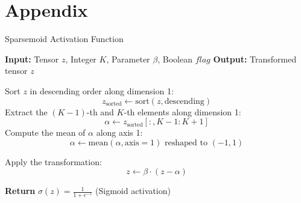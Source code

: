 


\section{Appendix}\label{appendix}

\begin{algorithm}\label{app:sparsemoid}
\caption{Sparsemoid Activation Function}
\begin{algorithmic}[1]
\State \textbf{Input:} Tensor $z$, Integer $K$, Parameter $\beta$, Boolean $flag$
\State \textbf{Output:} Transformed tensor $z$

    \State Sort $z$ in descending order along dimension 1:
    \[
    z_{\text{sorted}} \leftarrow \text{sort}(z, \text{descending})
    \]
    \State Extract the $(K-1)$-th and $K$-th elements along dimension 1:
    \[
    \alpha \leftarrow z_{\text{sorted}}[:, K-1:K+1]
    \]
    \State Compute the mean of $\alpha$ along axis 1:
    \[
    \alpha \leftarrow \text{mean}(\alpha, \text{axis}=1) \text{ reshaped to } (-1,1)
    \]
\EndIf

\State Apply the transformation:
\[
z \leftarrow \beta \cdot (z - \alpha)
\]

\State \textbf{Return} $\sigma(z) = \frac{1}{1 + e^{-z}}$ (Sigmoid activation)

\end{algorithmic}
\end{algorithm}

